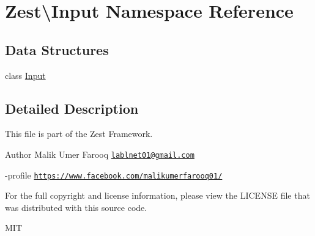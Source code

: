 \hypertarget{namespace_zest_1_1_input}{}\section{Zest\textbackslash{}Input Namespace Reference}
\label{namespace_zest_1_1_input}
\subsection*{Data Structures}
\begin{DoxyCompactItemize}
\item 
class \mbox{\hyperlink{class_zest_1_1_input_1_1_input}{Input}}
\end{DoxyCompactItemize}


\subsection{Detailed Description}
This file is part of the Zest Framework.

\begin{DoxyAuthor}{Author}
Malik Umer Farooq \href{mailto:lablnet01@gmail.com}{\tt lablnet01@gmail.\+com} 

-\/profile \href{https://www.facebook.com/malikumerfarooq01/}{\tt https\+://www.\+facebook.\+com/malikumerfarooq01/}
\end{DoxyAuthor}
For the full copyright and license information, please view the L\+I\+C\+E\+N\+SE file that was distributed with this source code.

M\+IT 